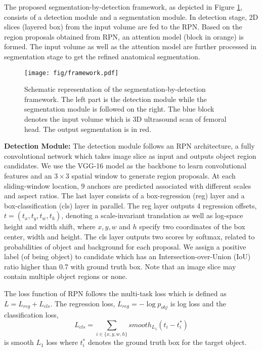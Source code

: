 The proposed segmentation-by-detection framework, as depicted in Figure \ref{fig:framework}, consists of a detection module and a segmentation module.
In detection stage, 2D slices (layered box) from the input volume are fed to the RPN. Based on the region proposals obtained from RPN, an attention model (block in orange) is formed. The input volume as well as the attention model are further processed in segmentation stage to get the refined anatomical segmentation. 
\vspace{1em} 

\begin{figure}[t]
\centering
\texttt{[image: fig/framework.pdf]}
\caption{Schematic representation of the segmentation-by-detection framework. The left part is the detection module while the segmentation module is followed on the right. The blue block denotes the input volume which is 3D ultrasound scan of femoral head. The output segmentation is in red.}
\label{fig:framework}
\end{figure}

\noindent\textbf{Detection Module:} 
The detection module follows an RPN architecture, a fully convolutional network which takes image slice as input and outputs object region candidates. 
We use the VGG-16 model as the backbone \cite{simonyan2014very} to learn convolutional features and an $3 \times 3$ spatial window to generate region proposals. At each sliding-window location, 9 anchors are predicted associated with different scales and aspect ratios. The last layer consists of a box-regression (reg) layer and a box-classification (cls) layer in parallel. The reg layer outputs 4 regression offsets, $ t = (t_x,t_y,t_w,t_h)$, denoting a scale-invariant translation as well as log-space height and width shift, where $x,y,w$ and $h$ specify two coordinates of the box center, width and height. The cls layer outputs two scores by softmax, related to probabilities of object and background for each proposal. We assign a positive label (of being object) to candidate which has an Intersection-over-Union (IoU) ratio higher than 0.7 with ground truth box. Note that an image slice may contain multiple object regions or none. 

The loss function of RPN follows the multi-task loss \cite{ren2015faster} which is defined as $L = L_{reg} + L_{cls}$. The regression loss, $L_{reg} = -\log p_{obj}$ is log loss and the classification loss,
\begin{equation} \label{eq:loss}
L_{cls} = \sum_{i \in \{x,y,w,h\}} smooth_{L_1} (t_i - t_i^*)
\end{equation}
is smooth $L_1$ loss where $t_i^*$ denotes the ground truth box for the target object. 
\vspace{1em}

